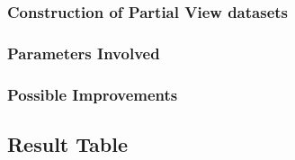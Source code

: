 \documentclass[a4paper]{article}
\begin{document}
	\subsubsection{Construction of Partial View datasets}	
	\subsubsection{Parameters Involved}	
	\subsubsection{Possible Improvements}
	

	\subsection{Result Table}	
\end{document}
